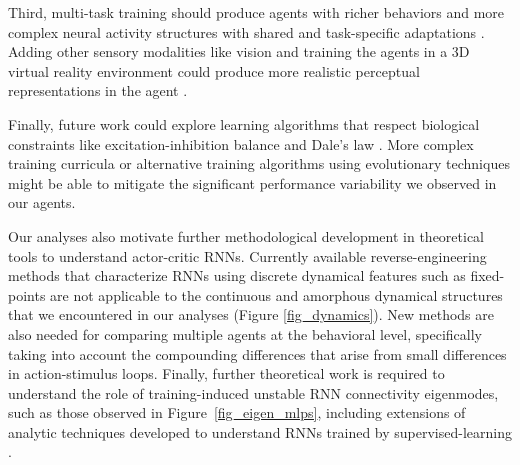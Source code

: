 \documentclass[5p,twocolumn,authoryear]{elsarticle}
\begin{document}
Third, multi-task training should produce agents with richer behaviors and more complex neural activity structures with shared and
task-specific adaptations \citep{crawshaw2020multi,yang2019task,duncker2020organizing,mlynarski2018adaptive,weber2019role}.
Adding other sensory modalities like vision and training the agents in a 3D virtual reality environment could produce more realistic perceptual representations in the agent \citep{crosby2019animal, crosby2020building}.

Finally, future work could explore learning algorithms that respect biological constraints like excitation-inhibition balance and Dale's law \citep{GOULAS2021,ehrlich2021psychrnn,delahunt2018biological}.
More complex training curricula \citep{bengio2009curriculum} or
alternative training algorithms using evolutionary techniques \citep{de2013evolutionary,stanley2019designing,gupta2021embodied} might be able to mitigate the significant performance variability we observed in our agents.


Our analyses also motivate further methodological development in theoretical tools to understand actor-critic RNNs.
Currently available reverse-engineering methods that characterize RNNs using discrete dynamical features such as fixed-points  \citep{sussillo2013opening,maheswaranathan2019universality,maheswaranathan2019reverse} are not applicable to the continuous and amorphous dynamical structures that we encountered in our analyses (Figure \ref{fig_dynamics}).
New methods are also needed for comparing multiple agents at the behavioral level, specifically taking into account the compounding differences that arise from small differences in action-stimulus loops.
Finally, further theoretical work is required to understand the role of training-induced unstable RNN connectivity eigenmodes, such as those observed in Figure~\ref{fig_eigen_mlps}, including extensions of analytic techniques developed to understand RNNs trained by supervised-learning \citep{sussillo2009generating,rajan2006eigenvalue,maheswaranathan2019reverse,mikulik2020meta,schaeffer2020reverse}.
\\
\end{document}
